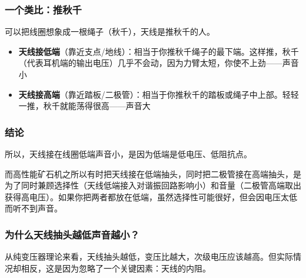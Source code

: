 \documentclass[12pt,UTF8]{ctexbook}
\begin{document}
\subsubsection{一个类比：推秋千}

可以把线圈想象成一根绳子（秋千），天线是推秋千的人。
\begin{itemize}[leftmargin=3.5em]
	\item \textbf{天线接低端}（靠近支点/地线）：相当于你推秋千绳子的最下端。这样推，秋千（代表耳机端的输出电压）几乎不会动，因为力臂太短，你使不上劲——声音小
	\item \textbf{天线接高端}（靠近踏板/二极管）：相当于你推秋千的踏板或绳子中上部。轻轻一推，秋千就能荡得很高——声音大
\end{itemize}

\subsubsection{结论}

所以，天线接在线圈低端声音小，是因为低端是低电压、低阻抗点。

而高性能矿石机之所以有时把天线接在低端抽头，同时把二极管接在高端抽头，是为了同时兼顾选择性（天线低端接入对谐振回路影响小）和音量（二极管高端取出获得高电压）。如果你把两者都放在低端，虽然选择性可能很好，但会因电压太低而听不到声音。

\subsubsection{为什么天线抽头越低声音越小？}

从纯变压器理论来看，天线抽头越低，变压比越大，次级电压应该越高。但实际情况却相反，这是因为忽略了一个关键因素：天线的内阻。
\end{document}
